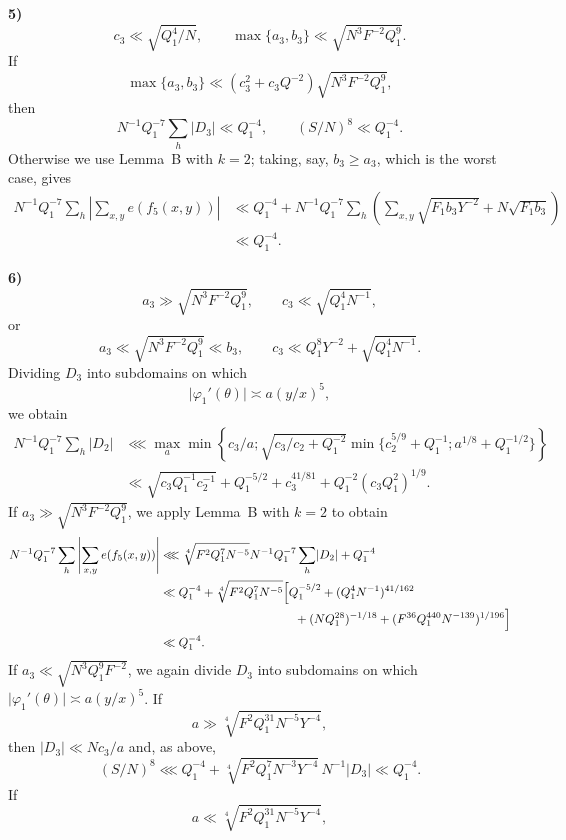 \documentclass[10pt]{article}
\begin{document}
\medskip
\noindent\textbf{5)}
\[
  c_3\ll\sqrt{Q_1^4/N},
  \qquad
  \max\{a_3,b_3\}\ll\sqrt{N^3F^{-2}Q_1^9}.
\]
If
\[
  \max\{a_3,b_3\}\ll
  (c_3^2+c_3Q^{-2})\sqrt{N^3F^{-2}Q_1^9},
\]
then
\[
  N^{-1}Q_1^{-7}\sum_h\lvert D_3\rvert\ll Q_1^{-4},
  \qquad (S/N)^8\ll Q_1^{-4}.
\]
Otherwise we use Lemma~B with $k=2$; taking, say, $b_3\geqslant a_3$, which is the worst case, gives
\[
\begin{aligned}
N^{-1}Q_1^{-7}\sum_h
 \left\lvert\sum_{x,y}e(f_5(x,y))\right\rvert
&\ll Q_1^{-4}+N^{-1}Q_1^{-7}\sum_h\left(
 \sum_{x,y}\sqrt{F_1b_3Y^{-2}}+N\sqrt{F_1b_3}
 \right)\\
&\ll Q_1^{-4}.
\end{aligned}
\]

\medskip
\noindent\textbf{6)}
\[
  a_3\gg\sqrt{N^3F^{-2}Q_1^9},
  \qquad c_3\ll\sqrt{Q_1^4N^{-1}},
\]
or
\[
  a_3\ll\sqrt{N^3F^{-2}Q_1^9}\ll b_3,
  \qquad
  c_3\ll Q_1^8Y^{-2}+\sqrt{Q_1^4N^{-1}}.
\]
Dividing $D_3$ into subdomains on which
\[
  \lvert\varphi_1'(\theta)\rvert\asymp a(y/x)^5,
\]
we obtain
\[
\begin{aligned}
N^{-1}Q_1^{-7}\sum_h\lvert D_2\rvert
&\lll\max_a\min\left\{
 c_3/a;
 \sqrt{c_3/c_2+Q_1^{-2}}
 \min\{c_2^{5/9}+Q_1^{-1};a^{1/8}+Q_1^{-1/2}\}
 \right\}\\
&\ll\sqrt{c_3Q_1^{-1}c_2^{-1}}+Q_1^{-5/2}
 +c_3^{41/81}+Q_1^{-2}(c_3Q_1^2)^{1/9}.
\end{aligned}
\]
If $a_3\gg\sqrt{N^3F^{-2}Q_1^9}$, we apply Lemma~B with $k=2$ to obtain
\[
\begin{aligned}
N^{-1}Q_1^{-7}\sum_h
 \left\lvert\sum_{x,y}e(f_5(x,y))\right\rvert
&\lll \sqrt[4]{F^2Q_1^7N^{-5}}
 N^{-1}Q_1^{-7}\sum_h\lvert D_2\rvert+Q_1^{-4}\\
&\ll Q_1^{-4}+\sqrt[4]{F^2Q_1^7N^{-5}}
 \Bigl[Q_1^{-5/2}+(Q_1^4N^{-1})^{41/162}\\
&\hspace{39mm}+(NQ_1^{28})^{-1/18}
 +(F^{36}Q_1^{440}N^{-139})^{1/196}\Bigr]\\
&\ll Q_1^{-4}.
\end{aligned}
\]
If $a_3\ll\sqrt{N^3Q_1^9F^{-2}}$, we again divide $D_3$ into subdomains on which
$\lvert\varphi_1'(\theta)\rvert\asymp a(y/x)^5$. If
\[
  a\gg\sqrt[4]{F^2Q_1^{31}N^{-5}Y^{-4}},
\]
then $\lvert D_3\rvert\ll Nc_3/a$ and, as above,
\[
  (S/N)^8\lll Q_1^{-4}
  +\sqrt[4]{F^2Q_1^7N^{-3}Y^{-4}}\,N^{-1}\lvert D_3\rvert
  \ll Q_1^{-4}.
\]
If
\[
  a\ll\sqrt[4]{F^2Q_1^{31}N^{-5}Y^{-4}},
\]
\end{document}

